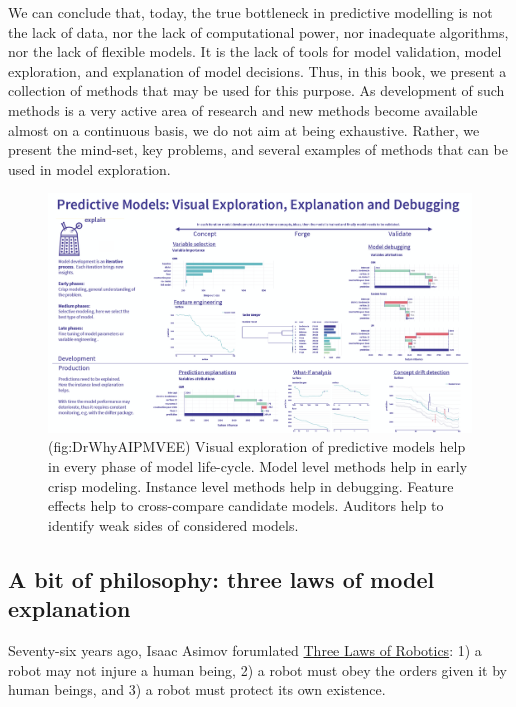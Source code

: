 \documentclass[12pt,]{krantz}
\theoremstyle{definition}
\theoremstyle{definition}
\theoremstyle{definition}
\theoremstyle{remark}
\begin{document}
We can conclude that, today, the true bottleneck in predictive modelling
is not the lack of data, nor the lack of computational power, nor
inadequate algorithms, nor the lack of flexible models. It is the lack
of tools for model validation, model exploration, and explanation of
model decisions. Thus, in this book, we present a collection of methods
that may be used for this purpose. As development of such methods is a
very active area of research and new methods become available almost on
a continuous basis, we do not aim at being exhaustive. Rather, we
present the mind-set, key problems, and several examples of methods that
can be used in model exploration.

\begin{figure}

{\centering \includegraphics[width=0.99\linewidth]{figure/DrWhyAI_PMVEE} 

}

\caption{(fig:DrWhyAIPMVEE) Visual exploration of predictive models help in every phase of model life-cycle. Model level methods help in early crisp modeling. Instance level methods help in debugging. Feature effects help to cross-compare candidate models. Auditors help to identify weak sides of considered models.}\label{fig:DrWhyAIPMVEE}
\end{figure}

\hypertarget{three-single-laws}{%
\subsection{A bit of philosophy: three laws of model
explanation}\label{three-single-laws}}

Seventy-six years ago, Isaac Asimov forumlated
\href{https://en.wikipedia.org/wiki/Three_Laws_of_Robotics}{Three Laws
of Robotics}: 1) a robot may not injure a human being, 2) a robot must
obey the orders given it by human beings, and 3) a robot must protect
its own existence.
\end{document}
